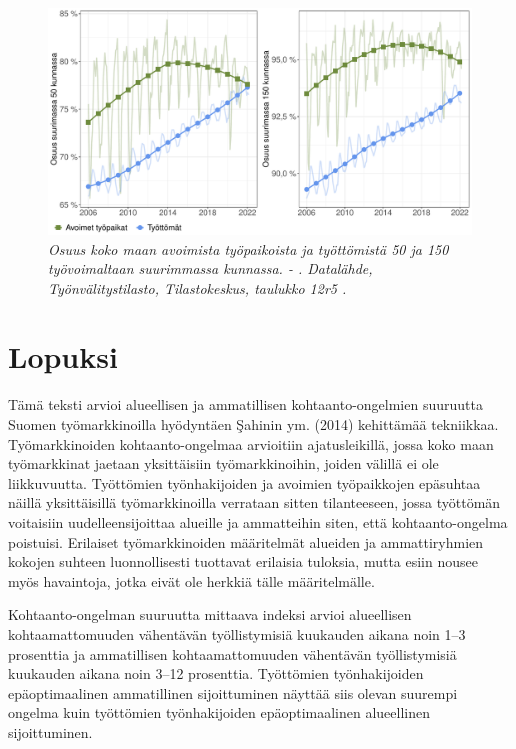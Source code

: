 \documentclass[12pt]{article}
\newcommand{\lastdatamonth}{\unskip}
\newcommand{\firstdatamonth}{\unskip}
\newcommand{\newcaption}[1]{\caption{\textit{\footnotesize{#1}}}}
\begin{document}
\begin{figure}
\centering
\includegraphics[scale = 0.55]{../kuviot/alueellinen_keskittyminen.pdf}
    \newcaption{Osuus koko maan avoimista työpaikoista ja työttömistä 50 ja 150 työvoimaltaan suurimmassa kunnassa. \protect \firstdatamonth \phantom{}  - \protect\lastdatamonth. Datalähde, Työnvälitystilasto, Tilastokeskus, taulukko 12r5 \protect \cite{svt2011}.}
   \label{fig:mo034}
\end{figure}

\section{Lopuksi}  \label{section:lopuksi}

Tämä teksti arvioi alueellisen ja ammatillisen kohtaanto-ongelmien suuruutta Suomen työmarkkinoilla hyödyntäen Şahinin ym. (2014) kehittämää tekniikkaa. Työmarkkinoiden kohtaanto-ongelmaa arvioitiin ajatusleikillä, jossa koko maan työmarkkinat jaetaan yksittäisiin työmarkkinoihin, joiden välillä ei ole liikkuvuutta. Työttömien työnhakijoiden ja avoimien työpaikkojen epäsuhtaa näillä yksittäisillä työmarkkinoilla verrataan sitten tilanteeseen, jossa työttömän voitaisiin uudelleensijoittaa alueille ja ammatteihin siten, että kohtaanto-ongelma poistuisi. Erilaiset työmarkkinoiden määritelmät alueiden ja ammattiryhmien kokojen suhteen luonnollisesti tuottavat erilaisia tuloksia, mutta esiin nousee myös havaintoja, jotka eivät ole herkkiä tälle määritelmälle. 

Kohtaanto-ongelman suuruutta mittaava indeksi arvioi alueellisen kohtaamattomuuden vähentävän työllistymisiä kuukauden aikana noin 1–3 prosenttia ja ammatillisen kohtaamattomuuden vähentävän työllistymisiä kuukauden aikana noin 3–12 prosenttia. Työttömien työnhakijoiden epäoptimaalinen ammatillinen sijoittuminen näyttää siis olevan suurempi ongelma kuin työttömien työnhakijoiden epäoptimaalinen alueellinen sijoittuminen. 
\end{document}
